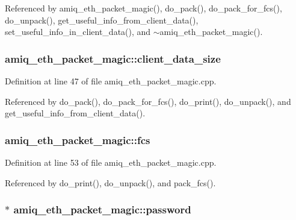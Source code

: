 Referenced by amiq\_\-eth\_\-packet\_\-magic(), do\_\-pack(), do\_\-pack\_\-for\_\-fcs(), do\_\-unpack(), get\_\-useful\_\-info\_\-from\_\-client\_\-data(), set\_\-useful\_\-info\_\-in\_\-client\_\-data(), and $\sim$amiq\_\-eth\_\-packet\_\-magic().\hypertarget{classamiq__eth__packet__magic_abc186b414e871bb0b06544bfb4bea774}{
\subsubsection[{client\_\-data\_\-size}]{ {\bf amiq\_\-eth\_\-packet\_\-magic::client\_\-data\_\-size}}}
\label{classamiq__eth__packet__magic_abc186b414e871bb0b06544bfb4bea774}


Definition at line 47 of file amiq\_\-eth\_\-packet\_\-magic.cpp.

Referenced by do\_\-pack(), do\_\-pack\_\-for\_\-fcs(), do\_\-print(), do\_\-unpack(), and get\_\-useful\_\-info\_\-from\_\-client\_\-data().\hypertarget{classamiq__eth__packet__magic_af8870f1b03256d0bed2dedc39a74d0f5}{
\subsubsection[{fcs}]{ {\bf amiq\_\-eth\_\-packet\_\-magic::fcs}}}
\label{classamiq__eth__packet__magic_af8870f1b03256d0bed2dedc39a74d0f5}


Definition at line 53 of file amiq\_\-eth\_\-packet\_\-magic.cpp.

Referenced by do\_\-print(), do\_\-unpack(), and pack\_\-fcs().\hypertarget{classamiq__eth__packet__magic_a42adfe3e292a6b67e466ded58dfa7d1c}{
\subsubsection[{password}]{$\ast$ {\bf amiq\_\-eth\_\-packet\_\-magic::password}}}
\label{classamiq__eth__packet__magic_a42adfe3e292a6b67e466ded58dfa7d1c}


